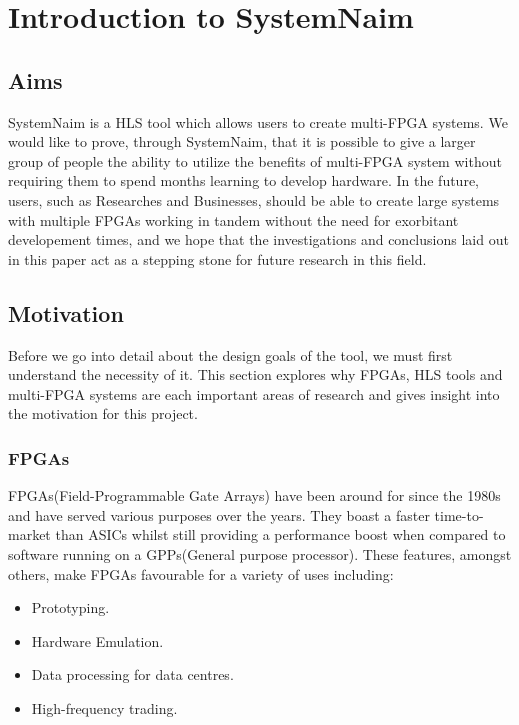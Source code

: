 \chapter{Introduction to SystemNaim}


\section{Aims}

SystemNaim is a HLS tool which allows users to create multi-FPGA systems. We would like to prove, through SystemNaim, that it is possible to give a larger group of people the ability to utilize the benefits of multi-FPGA system without requiring them to spend months learning to develop hardware. In the future, users, such as Researches and Businesses, should be able to create large systems with multiple FPGAs working in tandem without the need for exorbitant developement times, and we hope that the investigations and conclusions laid out in this paper act as a stepping stone for future research in this field.

\section{Motivation}

Before we go into detail about the design goals of the tool, we must first understand the necessity of it. This section explores why FPGAs, HLS tools and multi-FPGA systems are each important areas of research and gives insight into the motivation for this project.

\subsection{FPGAs}

FPGAs(Field-Programmable Gate Arrays) have been around for since the 1980s and have served various purposes over the years\cite{fpga-history}. They boast a faster time-to-market than ASICs whilst still providing a performance boost when compared to software running on a GPPs(General purpose processor). These features, amongst others, make FPGAs favourable for a variety of uses including:
\begin{itemize}
    \item Prototyping.
    \item Hardware Emulation.
    \item Data processing for data centres.
    \item High-frequency trading.
 \end{itemize}

